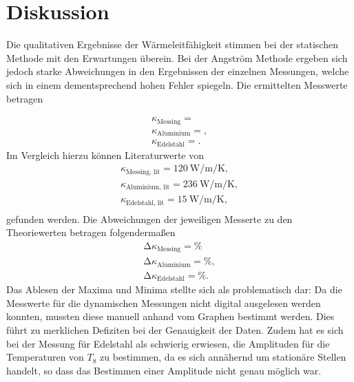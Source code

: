 \section{Diskussion}
\label{sec:Diskussion}
Die qualitativen Ergebnisse der Wärmeleitfähigkeit stimmen bei der statischen Methode mit den Erwartungen überein.
Bei der Angström Methode ergeben sich jedoch starke Abweichungen in den Ergebnissen der einzelnen Messungen, welche sich in einem dementsprechend hohen Fehler spiegeln.
Die ermittelten Messwerte betragen

\begin{align*}
  \kappa_\text{Messing} =  \\
  \kappa_\text{Aluminium} = ,\\
  \kappa_\text{Edelstahl} = .
\end{align*}
Im Vergleich hierzu können Literaturwerte von
\begin{align*}
  \kappa_\text{Messing, lit} = \SI{120}{\watt\per\metre\per\kelvin}, \\
  \kappa_\text{Aluminium, lit} = \SI{236}{\watt\per\metre\per\kelvin}, \\
  \kappa_\text{Edelstahl, lit} = \SI{15}{\watt\per\metre\per\kelvin}, \\
\end{align*}
gefunden werden.
Die Abweichungen der jeweiligen Messerte zu den Theoriewerten betragen folgendermaßen
\begin{align*}
  \increment \kappa_\text{Messing} =  \si{\percent}\\
  \increment \kappa_\text{Aluminium} =  \si{\percent},\\
  \increment \kappa_\text{Edelstahl} =  \si{\percent}.
\end{align*}
Das Ablesen der Maxima und Minima stellte sich als problematisch dar:
Da die Messwerte für die dynamischen Messungen nicht digital ausgelesen werden konnten, mussten diese manuell anhand vom Graphen bestimmt werden.
Dies führt zu merklichen Defiziten bei der Genauigkeit der Daten.
Zudem hat es sich bei der Messung für Edelstahl als schwierig erwiesen, die Amplituden für die Temperaturen von $T_8$ zu bestimmen, da es sich annähernd um stationäre Stellen handelt, so dass das Bestimmen einer Amplitude nicht genau möglich war.
